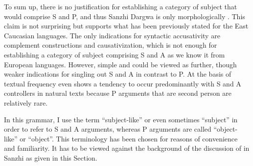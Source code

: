 To sum up, there is no justification for establishing a category of  subject that would comprise S and P, and thus Sanzhi Dargwa is only morphologically . This claim is not surprising but supports what has been previously stated for the East Caucasian languages. The only indications for syntactic accusativity are complement constructions and causativization, which is not enough for establishing a category of subject comprising S and A as we know it from European languages. However, simple  and  could be viewed as further, though weaker indications for singling out S and A in contrast to P. At the basis of textual frequency even  shows a tendency to occur predominantly with S and A controllers in natural texts because P arguments that are second person are relatively rare. 

In this grammar, I use the term ``subject-like'' or even sometimes ``subject'' in order to refer to S and A arguments, whereas P arguments are called ``object-like'' or ``object''. This terminology has been chosen for reasons of convenience and familiarity. It has to be viewed against the background of the discussion of  in Sanzhi as given in this Section.


